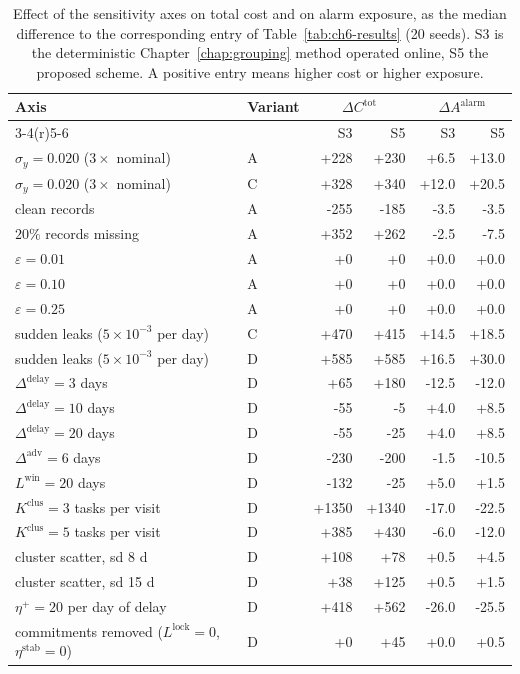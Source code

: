 \begin{table}[htbp]
\centering
\caption{Effect of the sensitivity axes on total cost and on alarm
exposure, as the median difference to the corresponding entry of
Table~\ref{tab:ch6-results} (20 seeds). S3 is the deterministic
Chapter~\ref{chap:grouping} method operated online, S5 the proposed
scheme. A positive entry means higher cost or higher exposure.}
\label{tab:ch6-sensitivity}
\setlength{\tabcolsep}{4pt}
\footnotesize
\begin{tabular}{@{}l l rr rr@{}}
\toprule
Axis & Variant & \multicolumn{2}{c}{$\Delta C^{\mathrm{tot}}$}
     & \multicolumn{2}{c}{$\Delta A^{\mathrm{alarm}}$} \\
\cmidrule(r){3-4}\cmidrule(r){5-6}
& & S3 & S5 & S3 & S5 \\
\midrule

$\sigma_y=0.020$ ($3\times$ nominal) & A & +228 & +230 & +6.5 & +13.0 \\
$\sigma_y=0.020$ ($3\times$ nominal) & C & +328 & +340 & +12.0 & +20.5 \\
clean records & A & -255 & -185 & -3.5 & -3.5 \\
$20\%$ records missing & A & +352 & +262 & -2.5 & -7.5 \\
$\varepsilon=0.01$ & A & +0 & +0 & +0.0 & +0.0 \\
$\varepsilon=0.10$ & A & +0 & +0 & +0.0 & +0.0 \\
$\varepsilon=0.25$ & A & +0 & +0 & +0.0 & +0.0 \\
sudden leaks ($5\times10^{-3}$ per day) & C & +470 & +415 & +14.5 & +18.5 \\
sudden leaks ($5\times10^{-3}$ per day) & D & +585 & +585 & +16.5 & +30.0 \\
$\Delta^{\mathrm{delay}}=3$ days & D & +65 & +180 & -12.5 & -12.0 \\
$\Delta^{\mathrm{delay}}=10$ days & D & -55 & -5 & +4.0 & +8.5 \\
$\Delta^{\mathrm{delay}}=20$ days & D & -55 & -25 & +4.0 & +8.5 \\
$\Delta^{\mathrm{adv}}=6$ days & D & -230 & -200 & -1.5 & -10.5 \\
$L^{\mathrm{win}}=20$ days & D & -132 & -25 & +5.0 & +1.5 \\
$K^{\mathrm{clus}}=3$ tasks per visit & D & +1350 & +1340 & -17.0 & -22.5 \\
$K^{\mathrm{clus}}=5$ tasks per visit & D & +385 & +430 & -6.0 & -12.0 \\
cluster scatter, sd 8 d & D & +108 & +78 & +0.5 & +4.5 \\
cluster scatter, sd 15 d & D & +38 & +125 & +0.5 & +1.5 \\
$\eta^{+}=20$ per day of delay & D & +418 & +562 & -26.0 & -25.5 \\
commitments removed ($L^{\mathrm{lock}}=0$, $\eta^{\mathrm{stab}}=0$) & D & +0 & +45 & +0.0 & +0.5 \\
\bottomrule
\end{tabular}
\end{table}
